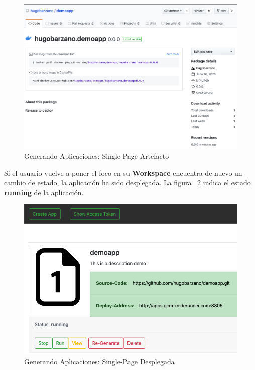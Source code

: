 \documentclass[a4paper,11pt]{book}
\begin{document}
\begin{figure}[H]
\centering
\includegraphics[scale=0.35]{imagenes/casouso_a/15.png}
\caption{  Generando Aplicaciones: Single-Page Artefacto}
\label{15}
\end{figure}

Si el usuario vuelve a poner el foco en su \textbf{Workspace} encuentra de nuevo un cambio de estado, la aplicación ha sido desplegada. La figura ~\ref{16} indica el estado \textbf{running} de la aplicación. 

\begin{figure}[H]
\centering
\includegraphics[scale=0.45]{imagenes/casouso_a/16.png}
\caption{   Generando Aplicaciones: Single-Page Desplegada }
\label{16}
\end{figure}

~\\
~\\
\end{document}
